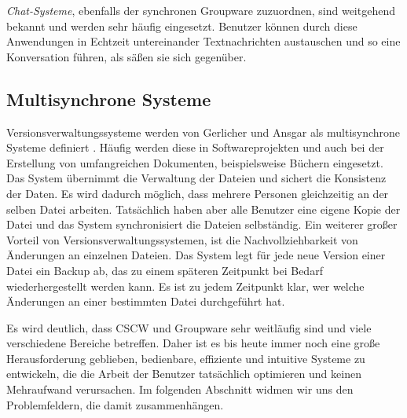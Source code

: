 \emph{Chat-Systeme}, ebenfalls der synchronen Groupware zuzuordnen, sind weitgehend bekannt und werden sehr häufig eingesetzt. Benutzer können durch diese Anwendungen in Echtzeit untereinander Textnachrichten austauschen und so eine Konversation führen, als säßen sie sich gegenüber. 

\subsection{Multisynchrone Systeme}

Versionsverwaltungssysteme werden von Gerlicher und Ansgar als multisynchrone Systeme definiert \citep{Gerlicher:2007p241}. Häufig werden diese in Softwareprojekten und auch bei der Erstellung von umfangreichen Dokumenten, beispielsweise Büchern eingesetzt. Das System übernimmt die Verwaltung der Dateien und sichert die Konsistenz der Daten. Es wird dadurch möglich, dass mehrere Personen gleichzeitig an der selben Datei arbeiten. Tatsächlich haben aber alle Benutzer eine eigene Kopie der Datei und das System synchronisiert die Dateien selbständig. Ein weiterer großer Vorteil von Versionsverwaltungssystemen, ist die Nachvollziehbarkeit von Änderungen \citep{Gerlicher:2007p241} an einzelnen Dateien. Das System legt für jede neue Version einer Datei ein Backup ab, das zu einem späteren Zeitpunkt bei Bedarf wiederhergestellt werden kann. Es ist zu jedem Zeitpunkt klar, wer welche Änderungen an einer bestimmten Datei durchgeführt hat. 

\bigskip Es wird deutlich, dass CSCW und Groupware sehr weitläufig sind und viele verschiedene Bereiche betreffen. Daher ist es bis heute immer noch eine große Herausforderung geblieben, bedienbare, effiziente und intuitive Systeme zu entwickeln, die die Arbeit der Benutzer tatsächlich optimieren und keinen Mehraufwand verursachen. Im folgenden Abschnitt widmen wir uns den Problemfeldern, die damit zusammenhängen.

